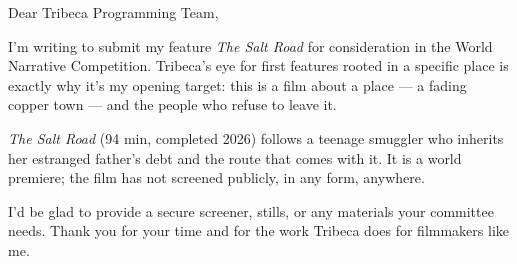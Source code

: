 \documentclass{cover}
\begin{document}

Dear Tribeca Programming Team,

I'm writing to submit my feature \textit{The Salt Road} for consideration in the World Narrative
Competition. Tribeca's eye for first features rooted in a specific place is exactly why it's my
opening target: this is a film about a place — a fading copper town — and the people who refuse to
leave it.

\textit{The Salt Road} (94 min, completed 2026) follows a teenage smuggler who inherits her
estranged father's debt and the route that comes with it. It is a world premiere; the film has not
screened publicly, in any form, anywhere.

I'd be glad to provide a secure screener, stills, or any materials your committee needs. Thank you
for your time and for the work Tribeca does for filmmakers like me.

\signoff
\end{document}
